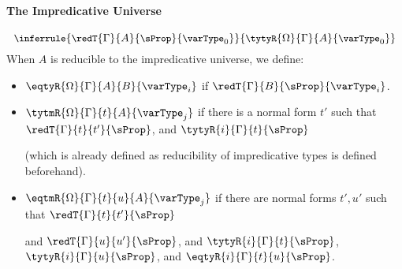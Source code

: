 \paragraph{The Impredicative Universe}
\[
{\small
  \inferrule{\redT{\Gamma}{A}{\sProp}{\varType_0}}
            {\tytyR{\Omega}{\Gamma}{A}{\varType_0}}
}\]
When $A$ is reducible to the impredicative universe, we define:
\begin{itemize}
  \item \( \eqtyR{\Omega}{\Gamma}{A}{B}{\varType_i} \) if \( \redT{\Gamma}{B}{\sProp}{\varType_i} \).
  \item \( \tytmR{\Omega}{\Gamma}{t}{A}{\varType_j} \) if there is a normal form \( t' \) such that
    \( \redT{\Gamma}{t}{t'}{\sProp} \), and \( \tytyR{i}{\Gamma}{t}{\sProp} \)

    (which is already defined as reducibility of impredicative types is defined beforehand).
  \item \( \eqtmR{\Omega}{\Gamma}{t}{u}{A}{\varType_j} \) if there are normal forms \( t', u' \) such that
    \( \redT{\Gamma}{t}{t'}{\sProp} \)

    and \( \redT{\Gamma}{u}{u'}{\sProp} \), and
    \( \tytyR{i}{\Gamma}{t}{\sProp} \), \( \tytyR{i}{\Gamma}{u}{\sProp} \), and \( \eqtyR{i}{\Gamma}{t}{u}{\sProp} \).
\end{itemize}

